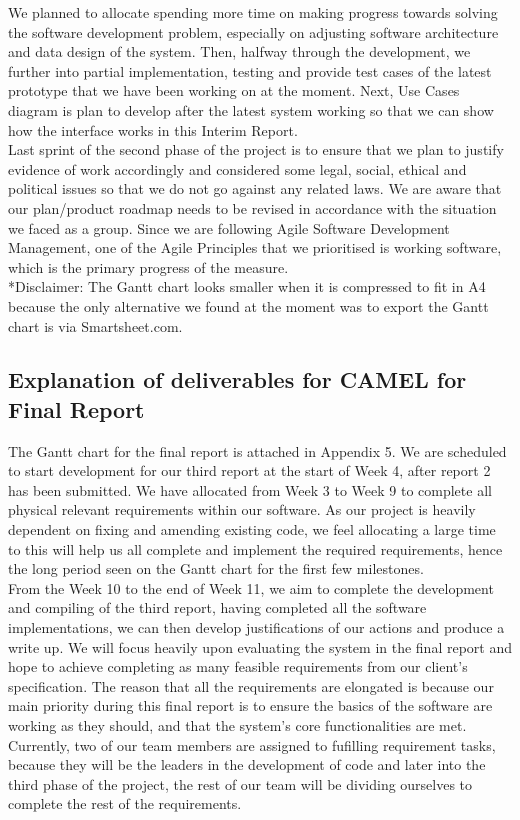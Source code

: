 	We planned to allocate spending more time on making progress towards solving the software development problem, especially on adjusting software architecture and data design of the system. Then, halfway through the development, we further into partial implementation, testing and provide test cases of the latest prototype that we have been working on at the moment. Next, Use Cases diagram is plan to develop after the latest system working so that we can show how the interface works in this Interim Report.\\
	
Last sprint of the second phase of the project is to ensure that we plan to justify evidence of work accordingly and considered some legal, social, ethical and political issues so that we do not go against any related laws. We are aware that our plan/product roadmap needs to be revised in accordance with the  situation we faced as a group.  Since we are following Agile Software Development Management, one of the Agile Principles that we prioritised is working software, which is the primary progress of the measure.\\

*Disclaimer: The Gantt chart looks smaller when it is compressed to fit in A4 because the only alternative we found at the moment was to export the Gantt chart is via Smartsheet.com.

\subsection*{Explanation of deliverables for CAMEL for Final Report}

The Gantt chart for the final report is attached in Appendix 5. We are scheduled to start development for our third report at the start of Week 4, after report 2 has been submitted. We have allocated from Week 3 to Week 9  to complete all physical relevant requirements within our software. As our project is heavily dependent on fixing and amending existing code, we feel allocating a large time to this will help us all complete and implement the required requirements, hence the long period seen on the Gantt chart for the first few milestones.\\

From the Week 10 to the end of Week 11, we aim to complete the development and compiling of the third report, having completed all the software implementations, we can then develop justifications of our actions and produce a write up. We will focus heavily upon evaluating the system in the final report and hope to achieve completing as many feasible requirements from our client’s specification. The reason that all the requirements are elongated is because our main priority during this final report is to ensure the basics of the software are working as they should, and that the system’s core functionalities are met. Currently, two of our team members are assigned to fufilling requirement tasks, because they will be the leaders in the development of code and later into the third phase of the project, the rest of our team will be dividing ourselves to complete the rest of the requirements. \\

